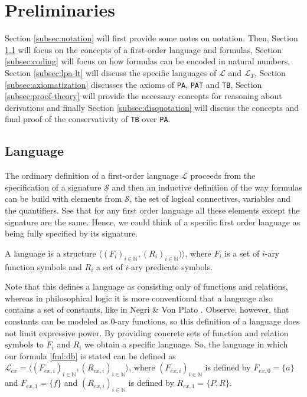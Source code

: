 \chapter{Preliminaries}
Section \ref{subsec:notation} will first provide some notes on notation. Then, Section \ref{subsec:language} will focus on the concepts of a first-order language and formulas, Section \ref{subsec:coding} will focus on how formulas can be encoded in natural numbers, Section \ref{subsec:lpa-lt} will discuss the specific languages of $\mathcal{L}$ and $\mathcal{L}_T$, Section \ref{subsec:axiomatization} discusses the axioms of \texttt{PA}, \texttt{PAT} and \texttt{TB}, Section \ref{subsec:proof-theory} will provide the necessary concepts for reasoning about derivations and finally Section \ref{subsec:disquotation} will discuss the concepts and final proof of the conservativity of \texttt{TB} over \texttt{PA}.

\section{Language}\label{subsec:language}
The ordinary definition of a first-order language $\mathcal{L}$ proceeds from the specification of a signature $\mathcal{S}$ and then an inductive definition of the way formulas can be build with elements from $\mathcal{S}$, the set of logical connectives, variables and the quantifiers. See that for any first order language all these elements except the signature are the same. Hence, we could think of a specific first order language as being fully specified by its signature.

\begin{definition}\label{def:FO-Language}
\leanok
  A language is a structure $\langle(F_i)_{i\in \mathbb{N}}, (R_i)_{i\in \mathbb{N}})\rangle$, where $F_i$ is a set of $i$-ary function symbols and $R_i$ a set of $i$-ary predicate symbols.
\end{definition}

Note that this defines a language as consisting only of functions and relations, whereas in philosophical logic it is more conventional that a language also contains a set of constants, like in Negri \& Von Plato \cite{negri:2001}. Observe, however, that constants can be modeled as $0$-ary functions, so this definition of a language does not limit expressive power. By providing concrete sets of function and relation symbols to $F_i$ and $R_i$ we obtain a specific language. So, the language in which our formula \ref{fml:db} is stated can be defined as $\mathcal{L}_{ex} = \langle (F_{ex,i})_{i \in \mathbb{N}}, (R_{ex,i})_{i \in \mathbb{N}} \rangle$, where $(F_{ex,i})_{i \in \mathbb{N}}$ is defined by $F_{ex,0} = \{a\}$ and $F_{ex,1} = \{f\}$ and $(R_{ex,i})_{i \in \mathbb{N}}$ is defined by $R_{ex,1} = \{P, R\}$.

